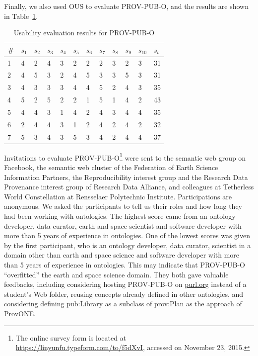 Finally, we also used OUS to evaluate PROV-PUB-O, and the results are shown in Table~\ref{tab:eval-pub}.
\begin{table}
	\centering
	\caption{Usability evaluation results for PROV-PUB-O}
	\label{tab:eval-pub}
	\begin{tabular}{|l|l|l|l|l|l|l|l|l|l|l|l|}
		\hline \# & $s_1$ & $s_2$ & $s_3$ & $s_4$ & $s_5$ & $s_6$ & $s_7$ & $s_8$ & $s_9$ & $s_{10}$ & $s_t$ \\ 
		\hline 1 & 4 & 2 & 4 & 3 & 2 & 2 & 2 & 3 & 2 & 3 & 31 \\ 
		\hline 2 & 4 & 5 & 3 & 2 & 4 & 5 & 3 & 3 & 5 & 3 & 31 \\ 
		\hline 3 & 4 & 3 & 3 & 3 & 4 & 4 & 5 & 2 & 4 & 3 & 35 \\ 
		\hline 4 & 5 & 2 & 5 & 2 & 2 & 1 & 5 & 1 & 4 & 2 & 43 \\ 
		\hline 5 & 4 & 4 & 3 & 1 & 4 & 2 & 4 & 3 & 4 & 4 & 35 \\ 
		\hline 6 & 2 & 4 & 4 & 3 & 1 & 2 & 4 & 2 & 4 & 2 & 32 \\ 
		\hline 7 & 5 & 3 & 4 & 3 & 5 & 3 & 4 & 2 & 4 & 4 & 37 \\ 
		\hline 
	\end{tabular} 
\end{table}
Invitations to evaluate PROV-PUB-O\footnote{The online survey form is located at \url{https://linyunfu.typeform.com/to/f5dXvI}, accessed on November 23, 2015.} were sent to the semantic web group on Facebook, the semantic web cluster of the Federation of Earth Science Information Partners, the Reproducibility interest group and the Research Data Provenance interest group of Research Data Alliance, and colleagues at Tetherless World Constellation at Rensselaer Polytechnic Institute. Participations are anonymous. We asked the participants to tell us their roles and how long they had been working with ontologies. The highest score came from an ontology developer, data curator, earth and space scientist and software developer with more than 5 years of experience in ontologies. One of the lowest scores was given by the first participant, who is an ontology developer, data curator, scientist in a domain other than earth and space science and software developer with more than 5 years of experience in ontologies. This may indicate that PROV-PUB-O ``overfitted'' the earth and space science domain. They both gave valuable feedbacks, including considering hosting PROV-PUB-O on \url{purl.org} instead of a student's Web folder, reusing concepts already defined in other ontologies, and considering defining pub:Library as a subclass of prov:Plan as the approach of ProvONE.

